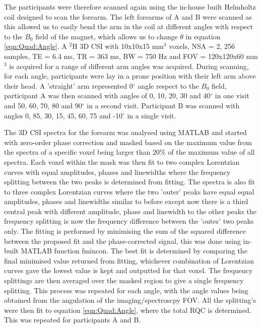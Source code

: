 \documentclass[class=article, crop=false]{standalone}
\begin{document}
The participants were therefore scanned again using the in-house built Helmholtz coil designed to scan the forearm. The left forearms of A and B were scanned as this allowed us to easily bend the arm in the coil at different angles with respect to the $B_0$ field of the magnet, which allows us to change $\theta$ in equation \ref{eqn:Quad:Angle}. A $^2$H 3D CSI with 10x10x15 mm$^3$ voxels, NSA = 2, 256 samples, TE = 6.4 ms, TR = 363 ms, BW = 750 Hz and FOV = 120x120x60 mm$^3$ is acquired for a range of different arm angles was acquired. During scanning, for each angle, participants were lay in a prone position with their left arm above their head. A 'straight' arm represented  0$^{\circ}$ angle respect to the $B_0$ field, participant A was then scanned with angles of 0, 10, 20, 30 and 40$^{\circ}$ in one visit and 50, 60, 70, 80 and 90$^{\circ}$ in a second visit. Participant B was scanned with angles 0, 85, 30, 15, 45, 60, 75 and -10$^{\circ}$ in a single visit. 

The 3D CSI spectra for the forearm was analysed using MATLAB and started with zero-order phase correction and masked based on the maximum value from the spectra of a specific voxel being larger than 20\% of the maximum value of all spectra. Each voxel within the mask was then fit to two complex Lorentzian curves with equal amplitudes, phases and linewidths where the frequency splitting between the two peaks is determined from fitting. The spectra is also fit to three complex Lorentzian curves where the two 'outer' peaks have equal equal amplitudes, phases and linewidths similar to before except now there is a third central peak with different amplitude, phase and linewidth to the other peaks the frequency splitting is now the frequency difference between the 'outer' two peaks only. The fitting is performed by minimising the sum of the squared difference between the proposed fit and the phase-corrected signal, this was done using in-built MATLAB function fmincon. The best fit is determined by comparing the final minimised value returned from fitting, whichever combination of Lorentzian curves gave the lowest value is kept and outputted for that voxel. The frequency splittings are then averaged over the masked region to give a single frequency splitting. This process was repeated for each angle, with the angle values being obtained from the angulation of the imaging/spectroscpy FOV. All the splitting's were then fit to equation \ref{eqn:Quad:Angle}, where the total RQC is determined. This was repeated for participants A and B.
\end{document}
